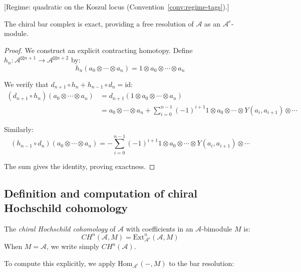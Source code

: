 \begin{theorem}
\label{thm:chiral-bar-resolution-exact}
\textup{[Regime: quadratic on the Koszul locus
\textup{(}Convention~\textup{\ref{conv:regime-tags})}.]}

The chiral bar complex is exact, providing a free resolution of $\mathcal{A}$ as an $\mathcal{A}^e$-module.
\end{theorem}

\begin{proof}
We construct an explicit contracting homotopy. Define $h_n: \mathcal{A}^{\boxtimes n+1} \to \mathcal{A}^{\boxtimes n+2}$ by:
\[
h_n(a_0 \otimes \cdots \otimes a_n) = 1 \otimes a_0 \otimes \cdots \otimes a_n
\]

We verify that $d_{n+1} \circ h_n + h_{n-1} \circ d_n = \text{id}$:
\begin{align}
(d_{n+1} \circ h_n)(a_0 \otimes \cdots \otimes a_n) &= d_{n+1}(1 \otimes a_0 \otimes \cdots \otimes a_n) \\
&= a_0 \otimes \cdots \otimes a_n + \sum_{i=0}^{n-1} (-1)^{i+1} 1 \otimes a_0 \otimes \cdots \otimes Y(a_i, a_{i+1}) \otimes \cdots
\end{align}

Similarly:
\[
(h_{n-1} \circ d_n)(a_0 \otimes \cdots \otimes a_n) = -\sum_{i=0}^{n-1} (-1)^{i+1} 1 \otimes a_0 \otimes \cdots \otimes Y(a_i, a_{i+1}) \otimes \cdots
\]

The sum gives the identity, proving exactness. \qedhere
\end{proof}

\subsection{Definition and computation of chiral Hochschild cohomology}

\begin{definition}
The \emph{chiral Hochschild cohomology} of $\mathcal{A}$ with coefficients in an $\mathcal{A}$-bimodule $M$ is:
\[
CH^n(\mathcal{A}, M) = \text{Ext}^n_{\mathcal{A}^e}(\mathcal{A}, M)
\]
When $M = \mathcal{A}$, we write simply $CH^n(\mathcal{A})$.
\end{definition}

To compute this explicitly, we apply $\text{Hom}_{\mathcal{A}^e}(-, M)$ to the bar resolution:

